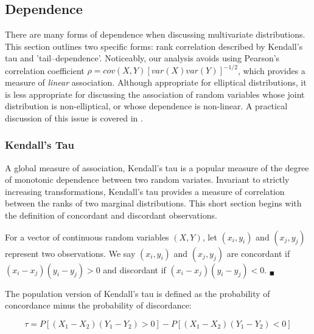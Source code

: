 \subsection{Dependence}

There are many forms of dependence when discussing multivariate distributions. This section outlines two specific forms: rank correlation described by Kendall's tau and 'tail--dependence'. Noticeably, our analysis avoids using Pearson's correlation coefficient $\rho = cov\left(X,Y\right)\left[var\left(X\right)var\left(Y\right)\right]^{-1/2}$, which provides a measure of \textit{linear} association. Although appropriate for elliptical distributions, it is less appropriate for discussing the association of random variables whose joint distribution is non-elliptical, or whose dependence is non-linear. A practical discussion of this issue is covered in \cite{Embrechts_McNeil_Straumann_2002}.

\subsubsection{Kendall's Tau}

A global measure of association, Kendall's tau is a popular measure of the degree of monotonic dependence between two random variates. Invariant to strictly increasing transformations, Kendall's tau provides a measure of correlation between the ranks of two marginal distributions. This short section begins with the definition of concordant and discordant observations.

\begin{definition}
	For a vector of continuous random variables $\left(X,Y\right)$, let $\left(x_{i},y_{i}\right)$ and $\left(x_{j},y_{j}\right)$ represent two observations. We say $\left(x_{i},y_{i}\right)$ and $\left(x_{j},y_{j}\right)$ are concordant if $\left(x_{i} - x_{j}\right)\left(y_{i}-y_{j}\right) > 0$ and discordant if $\left(x_{i}-x_{j}\right)\left(y_{i} - y_{j}\right) < 0$. $_{\blacksquare}$
\end{definition}

The population version of Kendall's tau is defined as the probability of concordance minus the probability of discordance:

\begin{equation}
	\tau = P\left[\left(X_{1} - X_{2}\right)\left(Y_{1} - Y_{2}\right) > 0\right] - P\left[\left(X_{1} - X_{2}\right)\left(Y_{1} - Y_{2}\right) < 0\right]
\end{equation}

